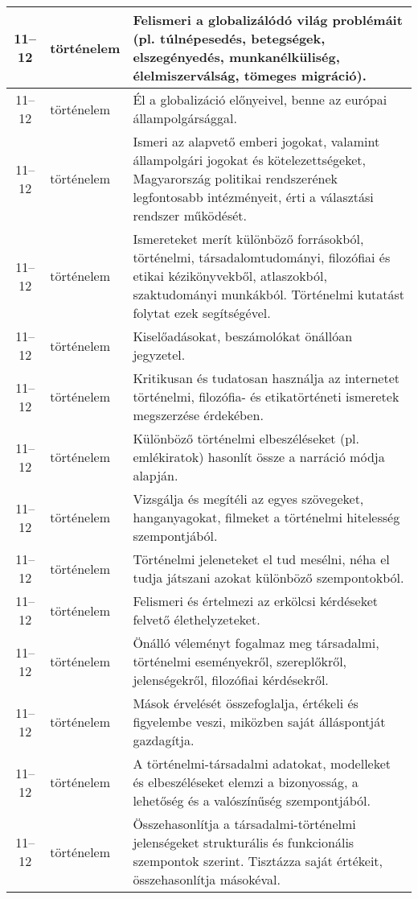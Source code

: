 \begin{small}
\begin{longtable}{c | p{2cm} |  p{11cm} }
              11--12 & történelem & Felismeri a globalizálódó világ problémáit (pl. túlnépesedés, betegségek, elszegényedés, munkanélküliség, élelmiszerválság, tömeges migráció). \\ \hline
              11--12 & történelem & Él a globalizáció előnyeivel, benne az európai állampolgársággal. \\ \hline
              11--12 & történelem & Ismeri az alapvető emberi jogokat, valamint állampolgári jogokat és kötelezettségeket, Magyarország politikai rendszerének legfontosabb intézményeit, érti a választási rendszer működését. \\ \hline
              11--12 & történelem & Ismereteket merít különböző forrásokból, történelmi, társadalomtudományi, filozófiai és etikai kézikönyvekből, atlaszokból, szaktudományi munkákból. Történelmi kutatást folytat ezek segítségével. \\ \hline
              11--12 & történelem & Kiselőadásokat, beszámolókat önállóan jegyzetel. \\ \hline
              11--12 & történelem & Kritikusan és tudatosan használja az internetet történelmi, filozófia- és etikatörténeti ismeretek megszerzése érdekében. \\ \hline
              11--12 & történelem & Különböző történelmi elbeszéléseket (pl. emlékiratok) hasonlít össze a narráció módja alapján. \\ \hline
              11--12 & történelem & Vizsgálja és megítéli az egyes szövegeket, hanganyagokat, filmeket a történelmi hitelesség szempontjából. \\ \hline
              11--12 & történelem & Történelmi jeleneteket el tud mesélni, néha el tudja játszani azokat különböző szempontokból. \\ \hline
              11--12 & történelem & Felismeri és értelmezi az erkölcsi kérdéseket felvető élethelyzeteket. \\ \hline
              11--12 & történelem & Önálló véleményt fogalmaz meg társadalmi, történelmi eseményekről, szereplőkről, jelenségekről, filozófiai kérdésekről. \\ \hline
              11--12 & történelem & Mások érvelését összefoglalja, értékeli és figyelembe veszi, miközben saját álláspontját gazdagítja. \\ \hline
              11--12 & történelem & A történelmi-társadalmi adatokat, modelleket és elbeszéléseket elemzi a bizonyosság, a lehetőség és a valószínűség szempontjából. \\ \hline
              11--12 & történelem & Összehasonlítja a társadalmi-történelmi jelenségeket strukturális és funkcionális szempontok szerint. Tisztázza saját értékeit, összehasonlítja másokéval. \\ \hline

\end{longtable}
\end{small}
